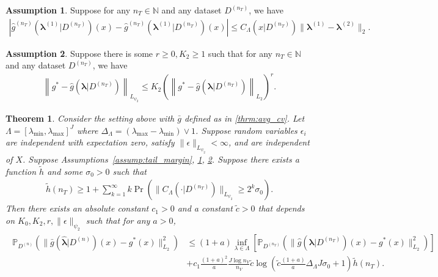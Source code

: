\documentclass[12pt]{article} %
\newtheorem{theorem}{Theorem}
\theoremstyle{definition}
\newtheorem{assump}{Assumption}
\begin{document}
\begin{assump}
	\label{assump:lipschitz}
	Suppose for any $n_T \in \mathbb{N}$ and any dataset $D^{(n_T)}$, we have
	\begin{align}
	\left |\hat{g}^{(n_T)}(\boldsymbol{\lambda}^{(1)}|D^{(n_T)})(x) - \hat{g}^{(n_T)}(\boldsymbol{\lambda}^{(1)}|D^{(n_T)})(x) \right | \le C_\Lambda(x|D^{(n_T)}) \|\boldsymbol{\lambda}^{(1)} - \boldsymbol{\lambda}^{(2)}\|_2.
	\end{align}
\end{assump}

\begin{assump}
	\label{assump:l2_psi2}
	Suppose there is some $r \ge 0, K_2 \ge 1$ such that for any $n_T \in \mathbb{N}$ and any dataset $D^{(n_T)}$, we have
	\begin{align}
	\left \|
	g^{*}-\hat{g}(\boldsymbol{\lambda}|D^{(n_{T})})
	\right \|_{L_{\psi_{2}}}
	\le K_2
	\left( \left \|
	g^{*}-\hat{g}(\boldsymbol{\lambda}|D^{(n_{T})})
	\right \|_{L_{2}}\right)^{r}.
	\end{align}
\end{assump}

\begin{theorem}
	\label{thrm:kfold}
	Consider the setting above with $\bar{g}$ defined as in \eqref{thrm:avg_cv}.
	Let $\Lambda=[\lambda_{\min},\lambda_{\max}]^{J}$ where $\Delta_{\Lambda} = (\lambda_{\max} - \lambda_{\min}) \vee 1$.
	Suppose random variables $\epsilon_i$ are independent with expectation zero, satisfy $\|\epsilon\|_{L_{\psi_2}} <\infty$, and are independent of $X$.
	Suppose Assumptions~\ref{assump:tail_margin}, \ref{assump:lipschitz}, \ref{assump:l2_psi2}.
	Suppose there exists a function $\tilde{h}$ and some $\sigma_0 > 0$ such that
	\begin{align}
	\tilde{h}(n_{T})
	\ge
	1 + \sum_{k=1}^{\infty}
	k\Pr\left(\|C_\Lambda(\cdot |D^{(n_{T})})\|_{L_{\psi_{2}}}\ge2^{k}\sigma_{0}\right).
	\end{align}
	Then there exists an absolute constant $c_{1}>0$
	and a constant $\tilde{c}>0$ that depends on $K_0,K_{2},r,\|\epsilon\|_{\psi_{2}}$
	such that for any $a > 0$,
	\begin{align}
	\begin{split}
	\mathbb{P}_{D^{(n)}}\left(
	\|
	\bar{g}(\hat{\boldsymbol{\lambda}}|D^{(n)})(x)
	-g^{*}(x)
	\|_{L_{2}}^{2}\right)
	& \le	(1+a)
	\inf_{\lambda\in\Lambda}
	\left[\mathbb{P}_{D^{(n_{T})}}\left(\|\hat{g}(\boldsymbol{\lambda}|D^{(n_{T})})(x)-g^{*}(x)\|_{L_{2}}^{2}\right)\right] \\
	& + c_{1} \frac{\left(1+a\right)^{2}}{a}
	\frac{J\log n_{V}}{n_{V}}
	\tilde{c}\log\left(\tilde{c}\frac{\left(1+a\right)}{a}\Delta_{\Lambda}J\sigma_{0}+1\right)
	\tilde{h}(n_{T}).
	\end{split}
	\label{eq:cv_lipschitz_oracle_ineq}
	\end{align}
\end{theorem}
\end{document}
